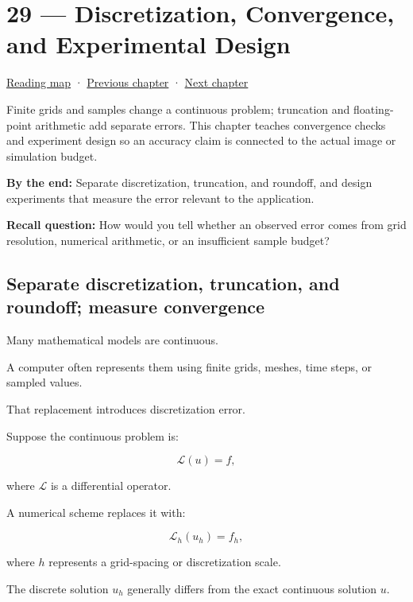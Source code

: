 \hypertarget{02-foundations-ii-ch029}{}
\chapter{29 --- Discretization, Convergence, and Experimental Design}\label{02-foundations-ii-ch029-discretization-convergence-and-experimental-design}

\hyperref[volume-reading-map]{Reading map} · \hyperref[02-foundations-ii-ch028-reliable-optimization-and-root-finding]{Previous chapter} · \hyperref[02-foundations-ii-ch030-monte-carlo-estimates-and-uncertainty-metrics]{Next chapter}

Finite grids and samples change a continuous problem; truncation and floating-point arithmetic add separate errors. This chapter teaches convergence checks and experiment design so an accuracy claim is connected to the actual image or simulation budget.

\textbf{By the end:} Separate discretization, truncation, and roundoff, and design experiments that measure the error relevant to the application.

\textbf{Recall question:} How would you tell whether an observed error comes from grid resolution, numerical arithmetic, or an insufficient sample budget?

\section{Separate discretization, truncation, and roundoff; measure convergence}\label{02-foundations-ii-ch029-separate-discretization-truncation-and-roundoff-measure-convergence}

Many mathematical models are continuous.

A computer often represents them using finite grids, meshes, time steps, or sampled values.

That replacement introduces discretization error.

Suppose the continuous problem is:

\[ \mathcal L(u)=f, \]

where \(\mathcal L\) is a differential operator.

A numerical scheme replaces it with:

\[ \mathcal L_h(u_h)=f_h, \]

where \(h\) represents a grid-spacing or discretization scale.

The discrete solution \(u_h\) generally differs from the exact continuous solution \(u\).


